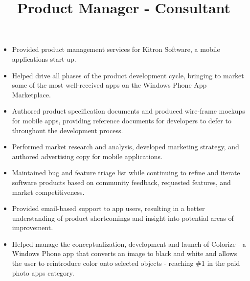 \begin{resume}
\title{Product Manager - Consultant}
\begin{position}
\begin{itemize}
	\item Provided product management services for Kitron Software, a mobile applications start-up.
	\item Helped drive all phases of the product development cycle, bringing to market some of the most well-received apps on the Windows Phone App Marketplace.
	\item Authored product specification documents and produced wire-frame mockups for mobile apps, providing reference documents for developers to defer to throughout the development process.
	\item Performed market research and analysis, developed marketing strategy, and authored advertising copy for mobile applications.
	\item Maintained bug and feature triage list while continuing to refine and iterate software products based on community feedback, requested features, and market competitiveness.
	\item Provided email-based support to app users, resulting in a better understanding of product shortcomings and insight into potential areas of improvement.
	\item Helped manage the conceptualization, development and launch of Colorize - a Windows Phone app that converts an image to black and white and allows the user to reintroduce color onto selected objects - reaching \#1 in the paid photo apps category.
\end{itemize}
\end{position}


\end{resume}
